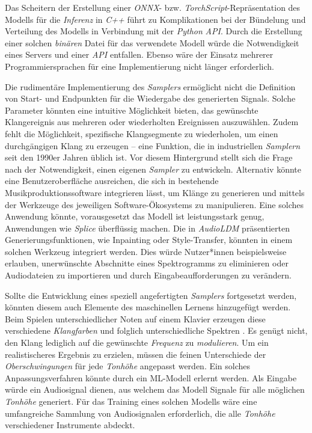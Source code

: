 \documentclass[
  a4paper,  %
  twoside,  %
  bibliography=totoc,
  headsepline,
  cleardoublepage=empty,
  parskip=half,
  draft=false
]{scrbook}
\begin{document}
Das Scheitern der Erstellung einer \emph{ONNX}- bzw. \emph{TorchScript}-Repräsentation des Modells für die \emph{Inferenz} in \emph{C++} führt zu Komplikationen bei der Bündelung und Verteilung des Modells in Verbindung mit der \emph{Python} \emph{API}. Durch die Erstellung einer solchen \emph{binären} Datei für das verwendete Modell würde die Notwendigkeit eines Servers und einer \emph{API} entfallen. Ebenso wäre der Einsatz mehrerer Programmiersprachen für eine Implementierung nicht länger erforderlich.

Die rudimentäre Implementierung des \emph{Samplers} ermöglicht nicht die Definition von Start- und Endpunkten für die Wiedergabe des generierten Signals. Solche Parameter könnten eine intuitive Möglichkeit bieten, das gewünschte Klangereignis aus mehreren oder wiederholten Ereignissen auszuwählen. Zudem fehlt die Möglichkeit, spezifische Klangsegmente zu wiederholen, um einen durchgängigen Klang zu erzeugen – eine Funktion, die in industriellen \emph{Samplern} seit den 1990er Jahren üblich ist. Vor diesem Hintergrund stellt sich die Frage nach der Notwendigkeit, einen eigenen \emph{Sampler} zu entwickeln. Alternativ könnte eine Benutzeroberfläche ausreichen, die sich in bestehende Musikproduktionssoftware integrieren lässt, um Klänge zu generieren und mittels der Werkzeuge des jeweiligen Software-Ökosystems zu manipulieren. Eine solches Anwendung könnte, vorausgesetzt das Modell ist leistungsstark genug, Anwendungen wie \emph{Splice} \cite{noauthor_royalty-free_nodate} überflüssig machen. Die in \emph{AudioLDM} \cite{liu_audioldm_2023} präsentierten Generierungsfunktionen, wie Inpainting oder Style-Transfer, könnten in einem solchen Werkzeug integriert werden. Dies würde Nutzer*innen beispielsweise erlauben, unerwünschte Abschnitte eines Spektrogramms zu eliminieren oder Audiodateien zu importieren und durch Eingabeaufforderungen zu verändern.

Sollte die Entwicklung eines speziell angefertigten \emph{Samplers} fortgesetzt werden, könnten diesem auch Elemente des maschinellen Lernens hinzugefügt werden. Beim Spielen unterschiedlicher Noten auf einem Klavier erzeugen diese verschiedene \emph{Klangfarben} und folglich unterschiedliche Spektren \cite{parker_good_2009}. Es genügt nicht, den Klang lediglich auf die gewünschte \emph{Frequenz} zu \emph{modulieren}. Um ein realistischeres Ergebnis zu erzielen, müssen die feinen Unterschiede der \emph{Oberschwingungen} für jede \emph{Tonhöhe} angepasst werden. Ein solches Anpassungsverfahren könnte durch ein ML-Modell erlernt werden. Als Eingabe würde ein Audiosignal dienen, aus welchem das Modell Signale für alle möglichen \emph{Tonhöhe} generiert. Für das Training eines solchen Modells wäre eine umfangreiche Sammlung von Audiosignalen erforderlich, die alle \emph{Tonhöhe} verschiedener Instrumente abdeckt.
\end{document}
